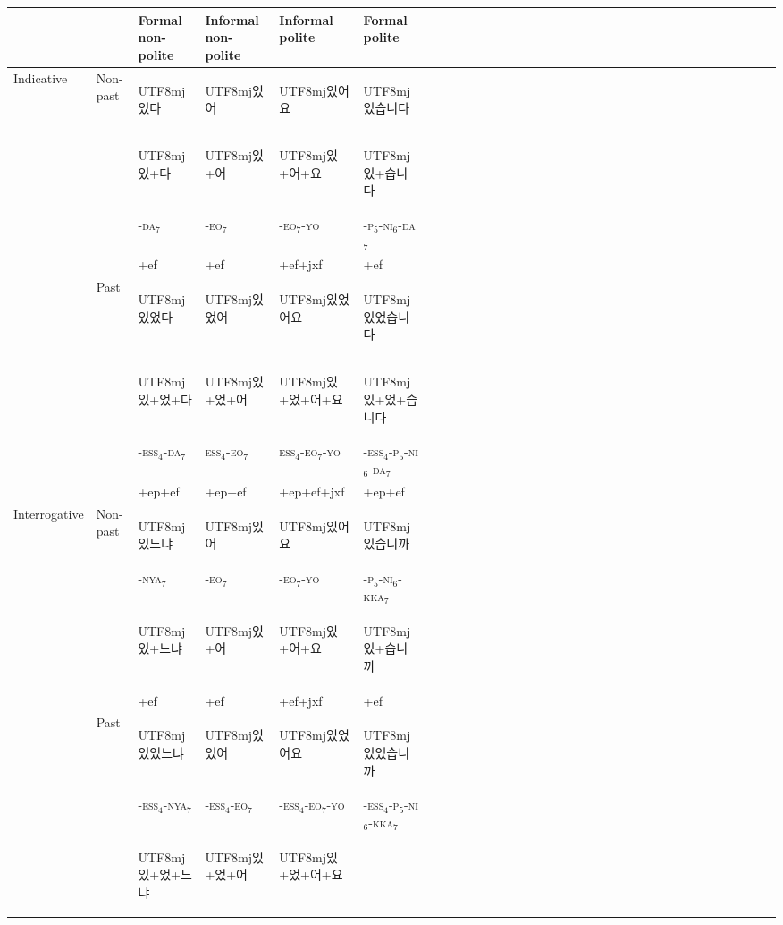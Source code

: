 \documentclass[11pt,letterpaper]{article}
\newcommand{\korean}[1]{\begin{CJK}{UTF8}{mj}#1\end{CJK}}
\begin{document}
\begin{table}[]
    \centering
    \begin{tabular}{llllllllllllllllllllllllllllllllll}
           &          &Formal non-polite & Informal non-polite & Informal polite & Formal polite \\ \hline \hline
    \multirow{6}{*}{Indicative}         & Non-past  & \korean{있다} & \korean{있어} & \korean{있어요} & \korean{있습니다} \\
         &  &  \korean{있+다} & \korean{있+어} & \korean{있+어+요} & \korean{있+습니다}\\
         &  &  -\textsc{da}$_7$            & -\textsc{eo}$_7$            & -\textsc{eo}$_7$-\textsc{yo}            & -\textsc{p}$_5$-\textsc{ni}$_6$-\textsc{da}$_7$ \\
         &  & +ef & +ef & +ef+jxf & +ef \\
         \hline
 & Past & \korean{있었다} & \korean{있었어} & \korean{있었어요} & \korean{있었습니다} \\
         &  & \korean{있+었+다} & \korean{있+었+어} & \korean{있+었+어+요} & \korean{있+었+습니다}\\
         && -\textsc{ess}$_4$-\textsc{da}$_7$            & \textsc{ess}$_4$-\textsc{eo}$_7$             & \textsc{ess}$_4$-\textsc{eo}$_7$-\textsc{yo} & -\textsc{ess}$_4$-\textsc{p}$_5$-\textsc{ni}$_6$-\textsc{da}$_7$ \\
         &  & +ep+ef & +ep+ef & +ep+ef+jxf & +ep+ef \\
         \hline
\multirow{6}{*}{Interrogative} & Non-past  & \korean{있느냐} & \korean{있어} & \korean{있어요} & \korean{있습니까} \\
&& -\textsc{nya}$_7$ & -\textsc{eo}$_7$ & -\textsc{eo}$_7$-\textsc{yo} & -\textsc{p}$_5$-\textsc{ni}$_6$-\textsc{kka}$_7$ \\
         &  & \korean{있+느냐} & \korean{있+어} & \korean{있+어+요} & \korean{있+습니까}\\
         &  & +ef              & +ef  & +ef+jxf & +ef\\
         \hline
         & Past & \korean{있었느냐} & \korean{있었어} & \korean{있었어요} & \korean{있었습니까} \\
         && -\textsc{ess}$_4$-\textsc{nya}$_7$ & -\textsc{ess}$_4$-\textsc{eo}$_7$ & -\textsc{ess}$_4$-\textsc{eo}$_7$-\textsc{yo} & -\textsc{ess}$_4$-\textsc{p}$_5$-\textsc{ni}$_6$-\textsc{kka}$_7$ \\
         &  & \korean{있+었+느냐} & \korean{있+었+어} & \korean{있+었+어+요}\\

\end{tabular}
\end{table}
\end{document}
